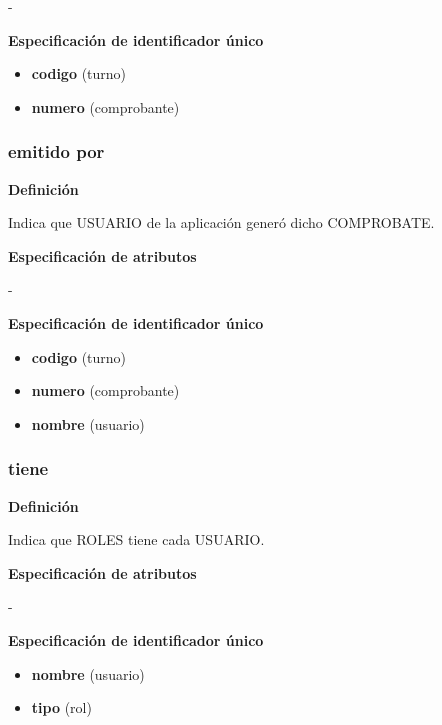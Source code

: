 \documentclass[a4paper,11pt]{article}
\begin{document}
-

\textbf{Especificación de identificador único}

\begin{itemize}

     \item \textbf{codigo} (turno)

     \item \textbf{numero} (comprobante)

\end{itemize}

\subsubsection{\textbf{emitido por}}

\textbf{Definición}

Indica que USUARIO de la aplicación generó dicho COMPROBATE.

\textbf{Especificación de atributos}

-

\textbf{Especificación de identificador único}

\begin{itemize}

     \item \textbf{codigo} (turno)

     \item \textbf{numero} (comprobante)

     \item \textbf{nombre} (usuario)

\end{itemize}

\subsubsection{\textbf{tiene}}

\textbf{Definición}

Indica que ROLES tiene cada USUARIO.

\textbf{Especificación de atributos}

-

\textbf{Especificación de identificador único}

\begin{itemize}

     \item \textbf{nombre} (usuario)

     \item \textbf{tipo} (rol)

\end{itemize}
\end{document}
